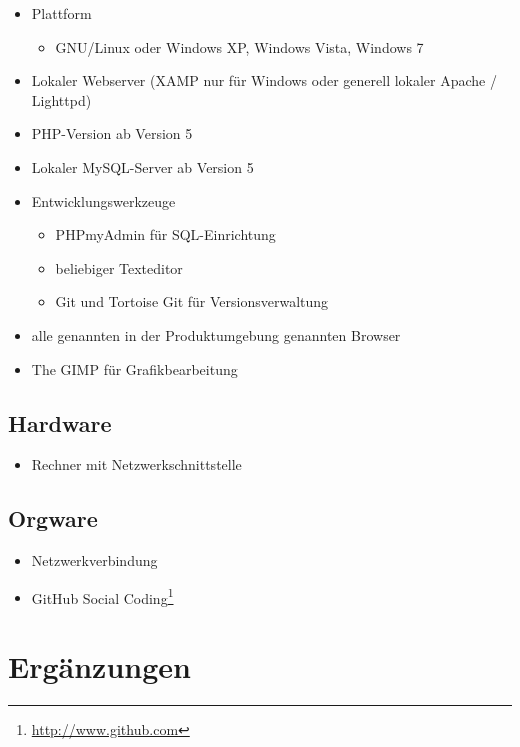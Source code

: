 \documentclass[a4paper,oneside]{scrreprt}
\begin{document}
\begin{itemize}
\item Plattform
    \begin{itemize}
    \item GNU/Linux oder Windows XP, Windows Vista, Windows 7
    \end{itemize}

\item Lokaler Webserver (XAMP nur für Windows oder generell lokaler Apache / Lighttpd)
\item PHP-Version ab Version 5
\item Lokaler MySQL-Server ab Version 5
\item Entwicklungswerkzeuge
    \begin{itemize}
    \item PHPmyAdmin für SQL-Einrichtung
    \item beliebiger Texteditor
    \item Git und Tortoise Git für Versionsverwaltung
    \end{itemize}

\item alle genannten in der Produktumgebung genannten Browser
\item The GIMP für Grafikbearbeitung
\end{itemize}

\section{Hardware}

\begin{itemize}
\item Rechner mit Netzwerkschnittstelle
\end{itemize}

\section{Orgware}

\begin{itemize}
\item Netzwerkverbindung
\item GitHub Social Coding\footnote{\url{http://www.github.com}}
\end{itemize}

\chapter{Ergänzungen}
\end{document}
